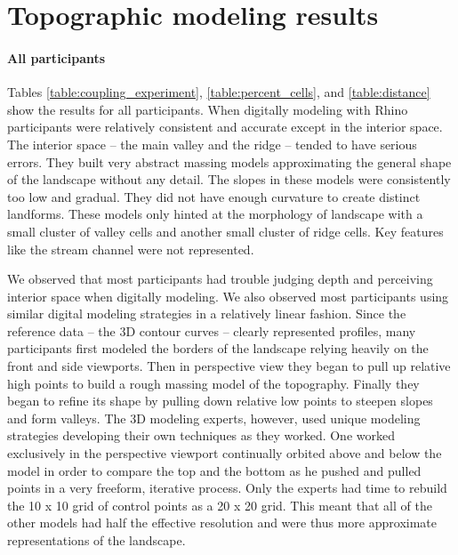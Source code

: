 
\label{appendix:methodology}



\section{Topographic modeling results}
\label{appendix:topographic_results}

\paragraph{All participants}
Tables \ref{table:coupling_experiment},
\ref{table:percent_cells}, 
and \ref{table:distance}
show the results for all participants. 
%
When digitally modeling with Rhino
participants were relatively 
consistent and accurate except in the interior space.
The interior space -- the main valley and the ridge -- 
tended to have serious errors.
%
They built very abstract massing models 
approximating the general shape of the landscape
without any detail. 
%
The slopes in these models 
were consistently too low and gradual.
They did not have enough curvature 
to create distinct landforms. 
%
These models only hinted at 
the morphology of landscape
with a small cluster of valley cells
and another small cluster of ridge cells.  
Key features like the stream channel
were not represented. 

We observed that most participants had trouble
judging depth and perceiving interior space 
when digitally modeling. 
We also observed most participants 
using similar digital modeling strategies 
in a relatively linear fashion.
Since the reference data -- the 3D contour curves -- 
clearly represented profiles, 
many participants first modeled
the borders of the landscape
relying heavily
on the front and side viewports.
Then in perspective view 
they began to pull up relative high points 
to build a rough massing model of the topography.
Finally they began to refine its shape 
by pulling down relative low points to 
steepen slopes and form valleys.
%
The 3D modeling experts, however, 
used unique modeling strategies
developing their own techniques as they worked.
One worked exclusively in the perspective viewport
continually orbited above and below the model 
in order to compare the top and the bottom
as he pushed and pulled points
in a very freeform, iterative process. 
%
Only the experts had time to rebuild the 
10 x 10 grid of control points as a 20 x 20 grid. 
This meant that all of the other models
had half the effective resolution
and were thus more approximate
representations of the landscape. 

